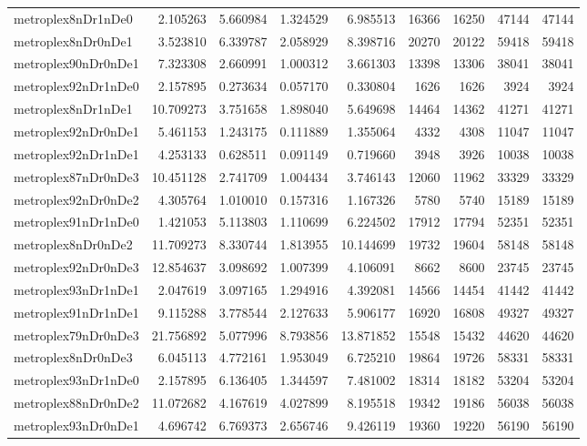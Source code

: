 \begin{longtable}{|l|r|r|r|r|r|r|r|r|}
metroplex8nDr1nDe0 & 2.105263 & 5.660984 & 1.324529 & 6.985513 & 16366 & 16250 & 47144 & 47144 \\
metroplex8nDr0nDe1 & 3.523810 & 6.339787 & 2.058929 & 8.398716 & 20270 & 20122 & 59418 & 59418 \\
metroplex90nDr0nDe1 & 7.323308 & 2.660991 & 1.000312 & 3.661303 & 13398 & 13306 & 38041 & 38041 \\
metroplex92nDr1nDe0 & 2.157895 & 0.273634 & 0.057170 & 0.330804 & 1626 & 1626 & 3924 & 3924 \\
metroplex8nDr1nDe1 & 10.709273 & 3.751658 & 1.898040 & 5.649698 & 14464 & 14362 & 41271 & 41271 \\
metroplex92nDr0nDe1 & 5.461153 & 1.243175 & 0.111889 & 1.355064 & 4332 & 4308 & 11047 & 11047 \\
metroplex92nDr1nDe1 & 4.253133 & 0.628511 & 0.091149 & 0.719660 & 3948 & 3926 & 10038 & 10038 \\
metroplex87nDr0nDe3 & 10.451128 & 2.741709 & 1.004434 & 3.746143 & 12060 & 11962 & 33329 & 33329 \\
metroplex92nDr0nDe2 & 4.305764 & 1.010010 & 0.157316 & 1.167326 & 5780 & 5740 & 15189 & 15189 \\
metroplex91nDr1nDe0 & 1.421053 & 5.113803 & 1.110699 & 6.224502 & 17912 & 17794 & 52351 & 52351 \\
metroplex8nDr0nDe2 & 11.709273 & 8.330744 & 1.813955 & 10.144699 & 19732 & 19604 & 58148 & 58148 \\
metroplex92nDr0nDe3 & 12.854637 & 3.098692 & 1.007399 & 4.106091 & 8662 & 8600 & 23745 & 23745 \\
metroplex93nDr1nDe1 & 2.047619 & 3.097165 & 1.294916 & 4.392081 & 14566 & 14454 & 41442 & 41442 \\
metroplex91nDr1nDe1 & 9.115288 & 3.778544 & 2.127633 & 5.906177 & 16920 & 16808 & 49327 & 49327 \\
metroplex79nDr0nDe3 & 21.756892 & 5.077996 & 8.793856 & 13.871852 & 15548 & 15432 & 44620 & 44620 \\
metroplex8nDr0nDe3 & 6.045113 & 4.772161 & 1.953049 & 6.725210 & 19864 & 19726 & 58331 & 58331 \\
metroplex93nDr1nDe0 & 2.157895 & 6.136405 & 1.344597 & 7.481002 & 18314 & 18182 & 53204 & 53204 \\
metroplex88nDr0nDe2 & 11.072682 & 4.167619 & 4.027899 & 8.195518 & 19342 & 19186 & 56038 & 56038 \\
metroplex93nDr0nDe1 & 4.696742 & 6.769373 & 2.656746 & 9.426119 & 19360 & 19220 & 56190 & 56190 \\

\end{longtable}
